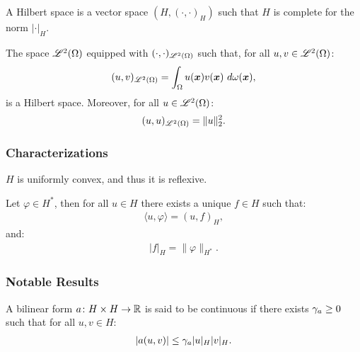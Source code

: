 \begin{definition} %
    A Hilbert space is a vector space $(H, (\cdot, \cdot)_H)$ such that $H$ is complete for the norm $\lvert \cdot \rvert_H$.
\end{definition}

\begin{remark}
    The space $\mathscr{L}^{2}(\Omega)$ equipped with $(\cdot, \cdot)_{\mathscr{L}^{2}(\Omega)}$ such that, for all $u, v \in \mathscr{L}^{2}(\Omega)$:
    \begin{gather}
        (u, v)_{\mathscr{L}^{2}(\Omega)} = \int_{\Omega} u(\bm{x}) v(\bm{x}) ~ d \omega(\bm{x}),
    \end{gather}
    is a Hilbert space. Moreover, for all $u \in \mathscr{L}^{2}(\Omega)$:
    \begin{gather}
        (u, u)_{\mathscr{L}^{2}(\Omega)} = \lVert u \rVert_2^2.
    \end{gather}
\end{remark}

\subsubsection{Characterizations}

\begin{theorem}
    $H$ is uniformly convex, and thus it is reflexive.
\end{theorem}

\begin{theorem}
    Let $\varphi \in H^*$, then for all $u \in H$ there exists a unique $f \in H$ such that:
    \begin{gather}
        \langle u, \varphi \rangle = (u, f)_H,
    \end{gather}
    and:
    \begin{gather}
        \lvert f \rvert_H = \lVert \varphi \rVert_{H^*}.
    \end{gather}
\end{theorem}

\subsubsection{Notable Results}

\begin{definition}
    A bilinear form $a \colon H \times H \rightarrow \mathbb{R}$ is said to be continuous if there exists $\gamma_{a} \geq 0$ such that for all $u, v \in H$:
    \begin{gather}
        \lvert a(u, v) \rvert \leq \gamma_{a} \lvert u \rvert_H \lvert v \rvert_H.
    \end{gather}
\end{definition}

